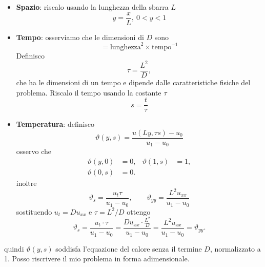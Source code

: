 \documentclass[10pt,a4paper,twoside,openright]{book}
\begin{document}
\begin{itemize}
    \item \textbf{Spazio}: riscalo usando la lunghezza della sbarra $L$
          \begin{equation*}
              y=\frac{x}{L},\ 0< y< 1
          \end{equation*}
    \item \textbf{Tempo}: osserviamo che le dimensioni di $D$ sono
          \begin{equation*}
              [D] =\text{lunghezza}^{2} \times \text{tempo}^{-1}
          \end{equation*}
          Definisco
          \begin{equation*}
              \tau =\frac{L^{2}}{D},
          \end{equation*}
          che ha le dimensioni di un tempo e dipende dalle caratteristiche fisiche del problema. Riscalo il tempo usando la costante $\tau$
          \begin{equation*}
              s=\frac{t}{\tau}
          \end{equation*}
    \item \textbf{Temperatura}: definisco
          \begin{equation*}
              \vartheta (y,s) =\frac{u(Ly,\tau s) -u_{0}}{u_{1} -u_{0}}
          \end{equation*}
          osservo che
          \begin{align*}
              \vartheta (y,0) & =0, & \vartheta (1,s) & =1, \\
              \vartheta (0,s) & =0. &                 &
          \end{align*}
          inoltre
          \begin{equation*}
              \vartheta _{s} =\frac{u_{t} \tau }{u_{1} -u_{0}} ,\qquad \vartheta _{yy} =\frac{L^{2} u_{xx}}{u_{1} -u_{0}}
          \end{equation*}
          sostituendo $u_{t} =Du_{xx}$ e $\tau =L^{2} /D$ ottengo
          \begin{equation*}
              \vartheta _{s} =\frac{u_{t} \cdotp \tau }{u_{1} -u_{0}} =\frac{Du_{xx} \cdotp \frac{L^{2}}{D}}{u_{1} -u_{0}} =\frac{L^{2} u_{xx}}{u_{1} -u_{0}} =\vartheta _{yy} .
          \end{equation*}
\end{itemize}
quindi $\vartheta(y,s)$ soddisfa l'equazione del calore senza il termine $D$, normalizzato a 1. Posso riscrivere il mio problema in forma adimensionale.
\end{document}
